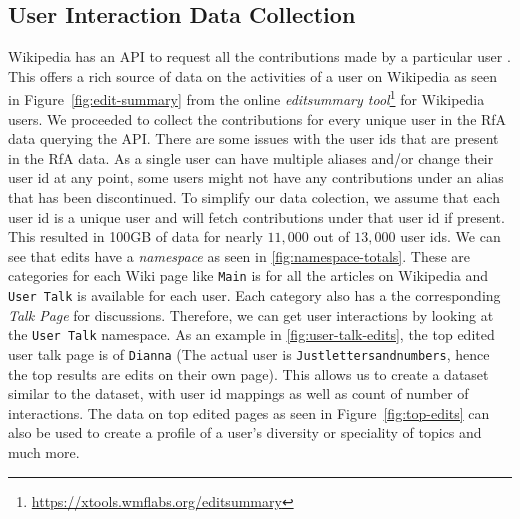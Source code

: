 \subsection{User Interaction Data Collection}
Wikipedia has an API to request all the contributions made by a particular user \cite{wiki:Usercontribs}. This offers a rich source of data on the activities of a user on Wikipedia as seen in Figure~\ref{fig:edit-summary} from the online \textit{editsummary tool}\footnote{\url{https://xtools.wmflabs.org/editsummary}} for Wikipedia users. We proceeded to collect the contributions for every unique user in the RfA data querying the API. There are some issues with the user ids that are present in the RfA data. As a single user can have multiple aliases and/or change their user id at any point, some users might not have any contributions under an alias that has been discontinued. To simplify our data colection, we assume that each user id is a unique user and will fetch contributions under that user id if present. This resulted in 100GB of data for nearly $11,000$ out of $13,000$ user ids. We can see that edits have a \textit{namespace} as seen in \ref{fig:namespace-totals}. These are categories for each Wiki page like \texttt{Main} is for all the articles on Wikipedia and \texttt{User Talk} is available for each user. Each category also has a the corresponding \textit{Talk Page} for discussions. Therefore, we can get user interactions by looking at the \texttt{User Talk} namespace. As an example in \ref{fig:user-talk-edits}, the top edited user talk page is of \texttt{Dianna} (The actual user is \texttt{Justlettersandnumbers}, hence the top results are edits on their own page). This allows us to create a dataset similar to  the \wikitalk  dataset, with user id mappings as well as count of number of interactions. The data on top edited pages as seen in Figure~\ref{fig:top-edits} can also be used to create a profile of a user's diversity or speciality of topics and much more.

